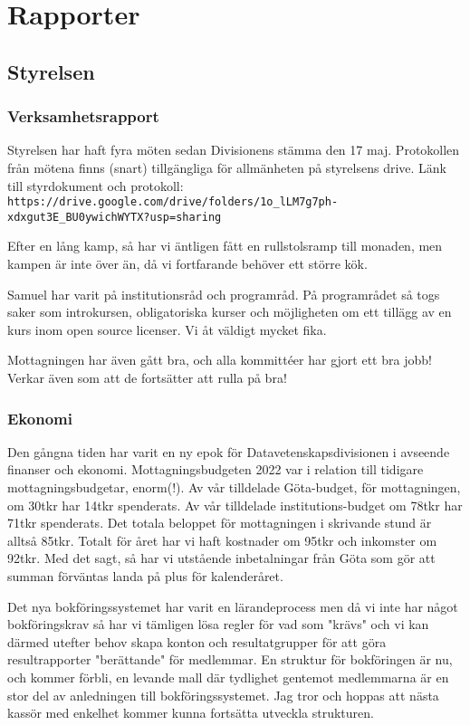 \documentclass[protokoll]{dvd}
\begin{document}
\section{Rapporter}

\subsection{Styrelsen}

\subsubsection*{Verksamhetsrapport}

Styrelsen har haft fyra möten sedan Divisionens stämma den 17 maj.
Protokollen från mötena finns (snart) tillgängliga för allmänheten på styrelsens drive.
Länk till styrdokument och protokoll: \verb|https://drive.google.com/drive/folders/1o_lLM7g7ph-xdxgut3E_BU0ywichWYTX?usp=sharing|

Efter en lång kamp, så har vi äntligen fått en rullstolsramp till monaden, men kampen är inte över än, då vi fortfarande behöver ett större kök.

Samuel har varit på institutionsråd och programråd. På programrådet så togs saker som introkursen, obligatoriska kurser och möjligheten om ett tillägg av en kurs inom open source licenser. Vi åt väldigt mycket fika.

Mottagningen har även gått bra, och alla kommittéer har gjort ett bra jobb! Verkar även som att de fortsätter att rulla på bra!

\newpage

\subsubsection*{Ekonomi}

Den gångna tiden har varit en ny epok för Datavetenskapsdivisionen i avseende finanser och ekonomi. Mottagningsbudgeten 2022 var i relation till tidigare mottagningsbudgetar, enorm(!). Av vår tilldelade Göta-budget, för mottagningen, om 30tkr har 14tkr spenderats. Av vår tilldelade institutions-budget om 78tkr har 71tkr spenderats. Det totala beloppet för mottagningen i skrivande stund är alltså 85tkr. Totalt för året har vi haft kostnader om 95tkr och inkomster om 92tkr. Med det sagt, så har vi utstående inbetalningar från Göta som gör att summan förväntas landa på plus för kalenderåret.

Det nya bokföringssystemet har varit en lärandeprocess men då vi inte har något bokföringskrav så har vi tämligen lösa regler för vad som "krävs" och vi kan därmed utefter behov skapa konton och resultatgrupper för att göra resultrapporter "berättande" för medlemmar. En struktur för bokföringen är nu, och kommer förbli, en levande mall där tydlighet gentemot medlemmarna är en stor del av anledningen till bokföringssystemet. Jag tror och hoppas att nästa kassör med enkelhet kommer kunna fortsätta utveckla strukturen.
\end{document}
